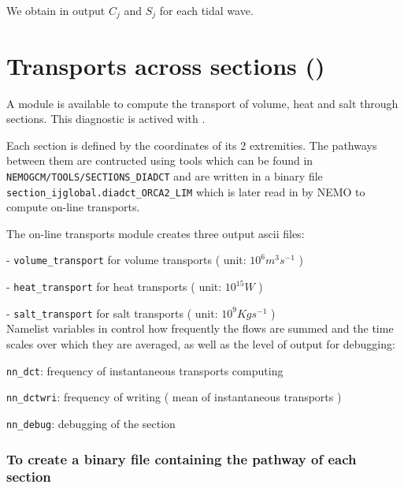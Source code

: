 We obtain in output $C_{j}$ and $S_{j}$ for each tidal wave.

\section{Transports across sections () }
\label{DIA_diag_dct}

A module is available to compute the transport of volume, heat and salt through sections. This diagnostic
is actived with .

Each section is defined by the coordinates of its 2 extremities. The pathways between them are contructed
using tools which can be found in  \texttt{NEMOGCM/TOOLS/SECTIONS\_DIADCT} and are written in a binary file
 \texttt{section\_ijglobal.diadct\_ORCA2\_LIM} which is later read in by NEMO to compute on-line transports.

The on-line transports module creates three output ascii files: 

- \texttt{volume\_transport} for volume transports (  unit: $10^{6} m^{3} s^{-1}$ )

- \texttt{heat\_transport}   for heat transports   (  unit: $10^{15} W $ )

- \texttt{salt\_transport}   for salt transports   (  unit: $10^{9}Kg s^{-1}$ )\\


Namelist variables in  control how frequently the flows are summed 
and the time scales over which they are averaged, as well as the level of output for debugging:


\texttt{nn\_dct}: frequency of instantaneous transports computing

\texttt{nn\_dctwri}: frequency of writing ( mean of instantaneous transports )

\texttt{nn\_debug}: debugging of the section

\subsubsection{ To create a binary file containing the pathway of each section }


